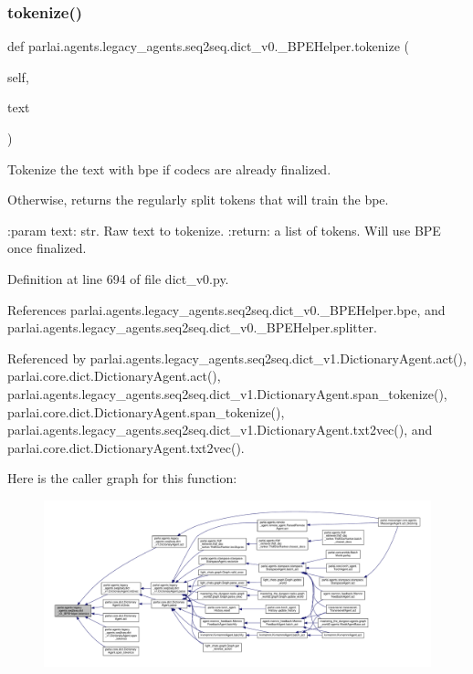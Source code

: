 \subsubsection{\texorpdfstring{tokenize()}{tokenize()}}
{\footnotesize\ttfamily def parlai.\+agents.\+legacy\+\_\+agents.\+seq2seq.\+dict\+\_\+v0.\+\_\+\+B\+P\+E\+Helper.\+tokenize (\begin{DoxyParamCaption}\item[{}]{self,  }\item[{}]{text }\end{DoxyParamCaption})}

\begin{DoxyVerb}Tokenize the text with bpe if codecs are already finalized.

Otherwise, returns the regularly split tokens that will train the bpe.

:param text: str. Raw text to tokenize.
:return: a list of tokens. Will use BPE once finalized.
\end{DoxyVerb}
 

Definition at line 694 of file dict\+\_\+v0.\+py.



References parlai.\+agents.\+legacy\+\_\+agents.\+seq2seq.\+dict\+\_\+v0.\+\_\+\+B\+P\+E\+Helper.\+bpe, and parlai.\+agents.\+legacy\+\_\+agents.\+seq2seq.\+dict\+\_\+v0.\+\_\+\+B\+P\+E\+Helper.\+splitter.



Referenced by parlai.\+agents.\+legacy\+\_\+agents.\+seq2seq.\+dict\+\_\+v1.\+Dictionary\+Agent.\+act(), parlai.\+core.\+dict.\+Dictionary\+Agent.\+act(), parlai.\+agents.\+legacy\+\_\+agents.\+seq2seq.\+dict\+\_\+v1.\+Dictionary\+Agent.\+span\+\_\+tokenize(), parlai.\+core.\+dict.\+Dictionary\+Agent.\+span\+\_\+tokenize(), parlai.\+agents.\+legacy\+\_\+agents.\+seq2seq.\+dict\+\_\+v1.\+Dictionary\+Agent.\+txt2vec(), and parlai.\+core.\+dict.\+Dictionary\+Agent.\+txt2vec().

Here is the caller graph for this function\+:
\nopagebreak
\begin{figure}[H]
\begin{center}
\leavevmode
\includegraphics[width=350pt]{classparlai_1_1agents_1_1legacy__agents_1_1seq2seq_1_1dict__v0_1_1__BPEHelper_a33d5217e263257279fe081b02da95d8d_icgraph}
\end{center}
\end{figure}


